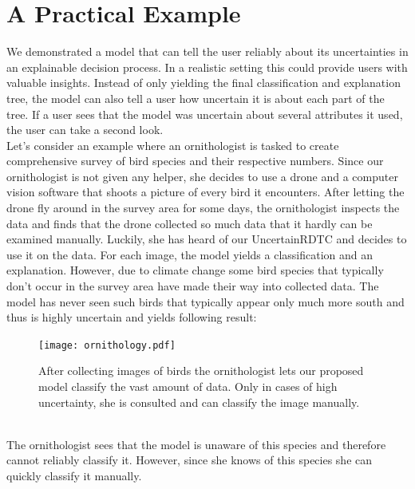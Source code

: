 \documentclass[a4paper,cleardoubleempty,BCOR1cm, 11pt]{report}
\begin{document}
\section{A Practical Example}
We demonstrated a model that can tell the user reliably about its uncertainties in an explainable decision process. In a realistic setting this could provide users with valuable insights. Instead of only yielding the final classification and explanation tree, the model can also tell a user how uncertain it is about each part of the tree. If a user sees that the model was uncertain about several attributes it used, the user can take a second look.\\
Let's consider an example where an ornithologist is tasked to create comprehensive survey of bird species and their respective numbers. Since our ornithologist is not given any helper, she decides to use a drone and a computer vision software that shoots a picture of every bird it encounters. After letting the drone fly around in the survey area for some days, the ornithologist inspects the data and finds that the drone collected so much data that it hardly can be examined manually. Luckily, she has heard of our UncertainRDTC and decides to use it on the data. For each image, the model yields a classification and an explanation. However, due to climate change some bird species that typically don't occur in the survey area have made their way into collected data. The model has never seen such birds that typically appear only much more south and thus is highly uncertain and yields following result:
\begin{figure}[h]
	\centering
	\texttt{[image: ornithology.pdf]}
	\caption{After collecting images of birds the ornithologist lets our proposed model classify the vast amount of data. Only in cases of high uncertainty, she is consulted and can classify the image manually.}
	\label{fig:qual}
\end{figure}
\\
The ornithologist sees that the model is unaware of this species and therefore cannot reliably classify it. However, since she knows of this species she can quickly classify it manually.
\end{document}

